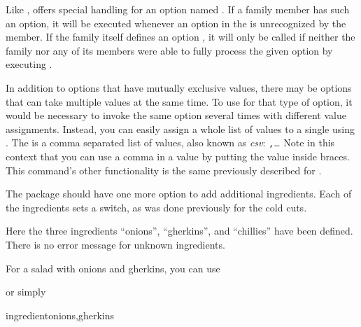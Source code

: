 Like
,  offers
special handling for an option named
. If a family member has such an
option, it will be executed whenever an option in the  is
unrecognized by the member. If the family itself defines an option
, it will only be called if neither the family nor any of its
members were able to fully process the given option by executing
.%
\EndIndexGroup


\begin{Declaration}
\end{Declaration}
In addition to options that have mutually exclusive values, there may be
options that can take multiple values at the same time. To use
 for that type of option, it would be
necessary to invoke the same option several times with different value
assignments. Instead, you can easily assign a whole list of values to a single
 using . The  is a comma
separated list of values, also known as \emph{csv}:
    \texttt{,}\dots
Note in this context that you can use a comma in a value by putting the value
inside braces. This command's other functionality is the same previously
described for .
\begin{Example}
  The  package should have one more option to add
  additional ingredients. Each of the ingredients sets a switch, as was done
  previously for the cold cuts.
\begin{lstcode}
  \newif\if@saladwith@onions
  \newif\if@saladwith@gherkins
  \newif\if@saladwith@chillies
\end{lstcode}
  Here the three ingredients ``onions'', ``gherkins'', and ``chillies'' have
  been defined. There is no error message for unknown ingredients.

  For a salad with onions and gherkins, you can use
\begin{lstcode}
\end{lstcode}
  or simply
\begin{lstcode}
               {ingredient}{onions,gherkins}
\end{lstcode}
\end{Example}

